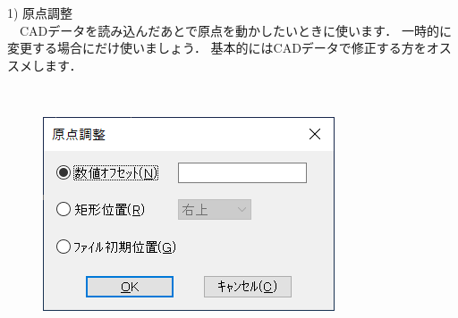 \begin{minipage}[t]{0.58\textwidth}
1) 原点調整\\
　CADデータを読み込んだあとで原点を動かしたいときに使います．
一時的に変更する場合にだけ使いましょう．
基本的にはCADデータで修正する方をオススメします．
\end{minipage}
\begin{minipage}[t]{0.02\textwidth}
　
\end{minipage}
\begin{minipage}[t]{0.4\textwidth}
\vspace*{-2zh}
\begin{figure}[H]
\centering
\includegraphics[width=\textwidth]{No6/fig/cad-origin.png}
\label{fig:cad-origin.png}
\end{figure}
\end{minipage}

